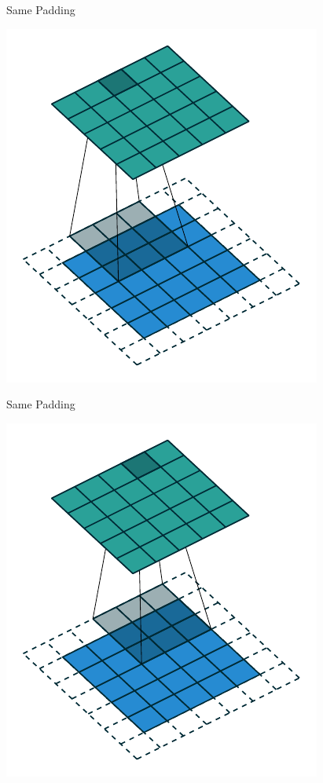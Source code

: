 \documentclass[10pt]{beamer}
\begin{document}
\begin{frame}{Same Padding}
\begin{center}
\includegraphics[scale=1]{images/same_padding_no_strides_02.pdf}
\end{center}
\end{frame}

\begin{frame}{Same Padding}
\begin{center}
\includegraphics[scale=1]{images/same_padding_no_strides_03.pdf}
\end{center}
\end{frame}
\end{document}
